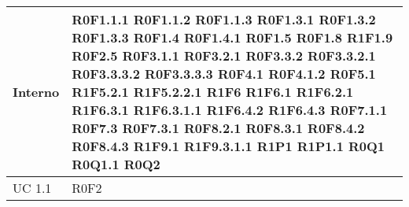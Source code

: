 \begin{center}
\begin{longtable}{| p{4cm} | p{4cm} |}
		Interno  &  R0F1.1.1 \newline R0F1.1.2 \newline R0F1.1.3 \newline R0F1.3.1 \newline R0F1.3.2 \newline R0F1.3.3 \newline R0F1.4 \newline R0F1.4.1 \newline R0F1.5 \newline R0F1.8 \newline R1F1.9 \newline R0F2.5 \newline R0F3.1.1 \newline R0F3.2.1 \newline R0F3.3.2 \newline R0F3.3.2.1 \newline R0F3.3.3.2 \newline R0F3.3.3.3 \newline R0F4.1 \newline R0F4.1.2 \newline R0F5.1 \newline R1F5.2.1 \newline R1F5.2.2.1 \newline R1F6 \newline R1F6.1 \newline R1F6.2.1 \newline R1F6.3.1 \newline R1F6.3.1.1  \newline R1F6.4.2  \newline R1F6.4.3 \newline R0F7.1.1 \newline R0F7.3 \newline R0F7.3.1 \newline R0F8.2.1 \newline R0F8.3.1 \newline R0F8.4.2 \newline R0F8.4.3 \newline R1F9.1 \newline R1F9.3.1.1 \newline R1P1 \newline R1P1.1 \newline R0Q1 \newline R0Q1.1 \newline R0Q2 \\
		\hline
		UC 1.1 & R0F2 \\

\end{longtable}
\end{center}
